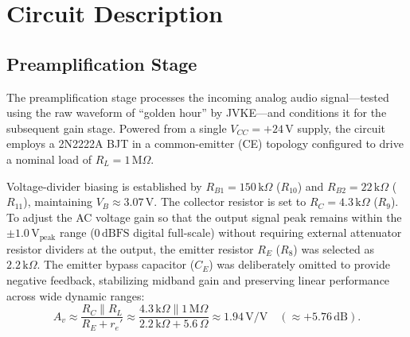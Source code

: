 \documentclass[conference]{IEEEtran}
\begin{document}
\section{Circuit Description}


\subsection{Preamplification Stage}
The preamplification stage processes the incoming analog audio signal—tested using the raw waveform of ``golden hour'' by JVKE—and conditions it for the subsequent gain stage. Powered from a single $V_{CC} = +24\,\mathrm{V}$ supply, the circuit employs a 2N2222A BJT in a common-emitter (CE) topology configured to drive a nominal load of $R_L = 1\,\mathrm{M}\Omega$.


Voltage-divider biasing is established by $R_{B1} = 150\,\mathrm{k}\Omega$ ($R_{10}$) and $R_{B2} = 22\,\mathrm{k}\Omega$ ($R_{11}$), maintaining $V_B \approx 3.07\,\mathrm{V}$. The collector resistor is set to $R_C = 4.3\,\mathrm{k}\Omega$ ($R_9$). To adjust the AC voltage gain so that the output signal peak remains within the $\pm1.0\,\mathrm{V_{peak}}$ range ($0\,\mathrm{dBFS}$ digital full-scale) without requiring external attenuator resistor dividers at the output, the emitter resistor $R_E$ ($R_8$) was selected as $2.2\,\mathrm{k}\Omega$. The emitter bypass capacitor ($C_E$) was deliberately omitted to provide negative feedback, stabilizing midband gain and preserving linear performance across wide dynamic ranges:
\begin{equation}
 A_v \approx \frac{R_C \parallel R_L}{R_E + r_e'} \approx \frac{4.3\,\mathrm{k}\Omega \parallel 1\,\mathrm{M}\Omega}{2.2\,\mathrm{k}\Omega + 5.6\,\Omega} \approx 1.94\,\mathrm{V/V} \quad (\approx +5.76\,\mathrm{dB}).
\end{equation}
\end{document}
